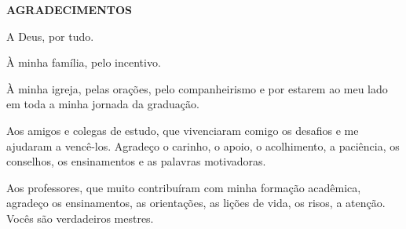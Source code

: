 \documentclass[a4paper]{article}
\begin{document}
\restoregeometry
\begin{titlepage}
	\begin{center}
		{\large \textbf{AGRADECIMENTOS}}\\[1cm]
	\end{center}

	A Deus, por tudo.
	
	À minha família, pelo incentivo.
	
	À minha igreja, pelas orações, pelo companheirismo e por estarem ao meu lado em toda a minha jornada da graduação.
	
	Aos amigos e colegas de estudo, que vivenciaram comigo os desafios e me ajudaram a vencê-los. Agradeço o carinho, o apoio, o acolhimento, a paciência, os conselhos, os ensinamentos e as palavras motivadoras.
	
	Aos professores, que muito contribuíram com minha formação acadêmica, agradeço os ensinamentos, as orientações, as lições de vida, os risos, a atenção. Vocês são verdadeiros mestres.
	
\end{titlepage}
\end{document}
